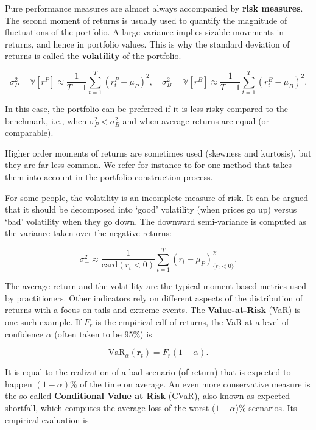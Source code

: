 Pure performance measures are almost always accompanied by \textbf{risk measures}. The second moment of returns is usually used to quantify the magnitude of fluctuations of the portfolio. A large variance implies sizable movements in returns, and hence in portfolio values. This is why the standard deviation of returns is called the \textbf{volatility} of the portfolio.

\begin{equation}
\sigma^2_P=\mathbb{V}[r^P]\approx \frac{1}{T-1}\sum_{t=1}^T (r_t^P-\mu_P)^2, \quad \sigma^2_B=\mathbb{V}[r^B]\approx \frac{1}{T-1}\sum_{t=1}^T (r_t^B-\mu_B)^2.
\end{equation}

In this case, the portfolio can be preferred if it is less risky compared to the benchmark, i.e., when $\sigma_P^2<\sigma_B^2$ and when average returns are equal (or comparable).

Higher order moments of returns are sometimes used (skewness and kurtosis), but they are far less common. We refer for instance to \cite{harvey2010portfolio} for one method that takes them into account in the portfolio construction process.

For some people, the volatility is an incomplete measure of risk. It can be argued that it should be decomposed into `good' volatility (when prices go up) versus `bad' volatility when they go down. The downward semi-variance is computed as the variance taken over the negative returns:

\begin{equation}
\sigma^2_-\approx \frac{1}{\text{card}(r_t<0)}\sum_{t=1}^T (r_t-\mu_P)^21_{\{r_t<0\}}.
\end{equation}

The average return and the volatility are the typical moment-based metrics used by practitioners. Other indicators rely on different aspects of the distribution of returns with a focus on tails and extreme events. The \textbf{Value-at-Risk} (VaR) is one such example. If $F_r$ is the empirical cdf of returns, the VaR at a level of confidence $\alpha$ (often taken to be 95\%) is

\begin{equation}
\text{VaR}_\alpha(\textbf{r}_t)=F_r(1-\alpha).
\end{equation}

It is equal to the realization of a bad scenario (of return) that is expected to happen $(1 -\alpha)$\% of the time on average.
An even more conservative measure is the so-called \textbf{Conditional Value at Risk} (CVaR), also known as expected shortfall, which computes the average loss of the worst ($1 -\alpha$)\% scenarios. Its empirical evaluation is

